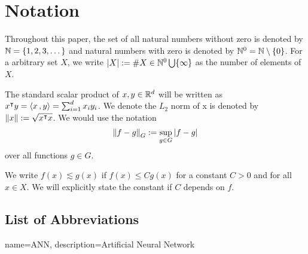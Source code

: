 \chapter*{Notation}
\label{c:Notation}

Throughout this paper, the set of all natural numbers without zero is denoted by
$\mathbb{N} = \{1,2,3,\dots\}$ and natural numbers with zero is denoted by $\mathbb{N}^0 =
\mathbb{N} \setminus \{0\}$. For a arbitrary set $X$, we write $\left| X \right| := \# X \in
\mathbb{N}^0 \bigcup \{\infty\}$ as the number of elements of $X$.

The standard scalar product of $x,y\in\mathbb{R}^d$ will be written as $x{}^{\intercal} y =
\left\langle x\, , y \right\rangle = \sum_{i=1}^d x_iy_i$. We denote the $L_2$ norm of x is denoted by
$\left\| x \right\| := \sqrt{x{}^{\intercal} x}$. We would use the notation
\begin{equation}
    \left\| f - g \right\|_{G} := \sup_{g\in G} \left| f - g \right|
\end{equation}
over all functions $g \in G$.

We write $f(x) \lesssim g(x)$ if $f(x) \leq C g(x)$ for a constant $C>0$ and for
all $x \in X$. We will explicitly state the constant if $C$ depends on $f$.

\section*{List of Abbreviations}

\printglossary

{
    name=ANN,
    description={Artificial Neural Network}
}





